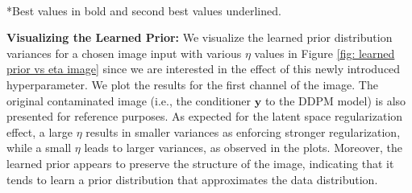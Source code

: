 \begin{table}[!t]
\centering
\begin{small}
\setlength{\tabcolsep}{5pt} %
\caption{Weather-specific (RainDrop dataset) model comparison.}
\vspace{0.1cm}
\label{table: ir sota comp raindrop}
\\
\vspace{0.1cm}
\footnotesize
*Best values in bold and second best values underlined. 
\end{small}
\end{table}

\noindent\textbf{Visualizing the Learned Prior:}
We visualize the learned prior distribution variances for a chosen image input with various $\eta$ values in Figure \ref{fig: learned prior vs eta image} since we are interested in the effect of this newly introduced hyperparameter.
We plot the results for the first channel of the image. The original contaminated image (i.e., the conditioner $\mathbf{y}$ to the DDPM model) is also presented for reference purposes. As expected for the latent space regularization effect, a large $\eta$ results in smaller variances as enforcing stronger regularization, while a small $\eta$ leads to larger variances, as observed in the plots. Moreover, the learned prior appears to preserve the structure of the image, indicating that it tends to learn a prior distribution that approximates the data distribution.


